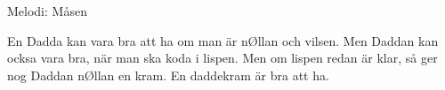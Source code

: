 \begin{song}

\begin{songmeta}
Melodi: Måsen
\end{songmeta}
\begin{songtext}
En Dadda kan vara bra att ha
om man är nØllan och vilsen.
Men Daddan kan ocksa vara bra,
när man ska koda i lispen.
Men om lispen redan är klar,
så ger nog Daddan nØllan en kram.
En daddekram
är bra att ha.
\end{songtext}
\end{song}
